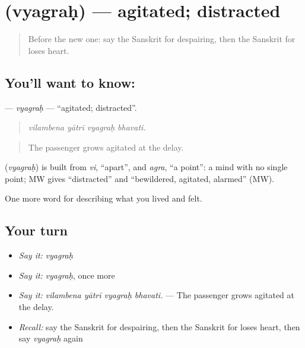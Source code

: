 \section[\texorpdfstring{\sk{व्यग्रः} (vyagraḥ)}{व्यग्रः (vyagraḥ)}]{ (vyagraḥ) — agitated; distracted}

\label{lesson:SA-C452-vyagrah}



\begin{quote}
Before the new one: say the Sanskrit for despairing, then the Sanskrit for loses heart.
\end{quote}

\subsection*{You'll want to know: }
\textbf{} — \emph{vyagraḥ} — \textquotedblleft{}agitated; distracted\textquotedblright{}.

\begin{quote}
   
\end{quote}

\begin{quote}
\emph{vilambena yātrī vyagraḥ bhavati.}
\end{quote}

\begin{quote}
The passenger grows agitated at the delay.
\end{quote}

\begin{cousinweb}
\textbf{} (\emph{vyagraḥ}) is built from \emph{vi}, \textquotedblleft{}apart\textquotedblright{}, and \emph{agra}, \textquotedblleft{}a point\textquotedblright{}: a mind with no single point; MW gives \textquotedblleft{}distracted\textquotedblright{} and \textquotedblleft{}bewildered, agitated, alarmed\textquotedblright{} (MW).
\end{cousinweb}

\begin{grammarlens}[title={What you've built}]
One more word for describing what you lived and felt.
\end{grammarlens}

\subsection*{Your turn}
\begin{itemize}
\raggedright
  \item \emph{Say it:} \emph{vyagraḥ}
  \item \emph{Say it:} \emph{vyagraḥ}, once more
  \item \emph{Say it:} \emph{vilambena yātrī vyagraḥ bhavati.} — The passenger grows agitated at the delay.
  \item \emph{Recall:} say the Sanskrit for despairing, then the Sanskrit for loses heart, then say \emph{vyagraḥ} again
\end{itemize}

